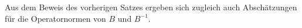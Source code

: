 \begin{Satz}
\begin{Beweis}


    \end{Beweis}
\end{Satz}

Aus dem Beweis des vorherigen Satzes ergeben sich zugleich auch Abschätzungen für die Operatornormen von $B$ und $B^{-1}$.

